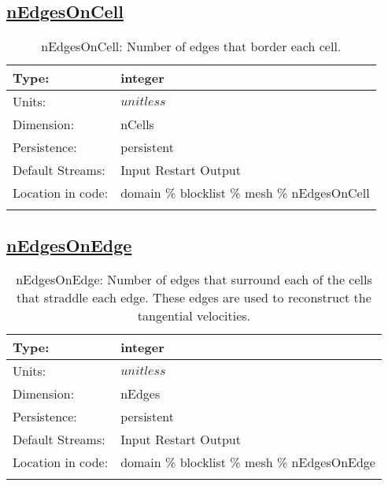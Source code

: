 \subsection[nEdgesOnCell]{\hyperref[sec:var_tab_mesh]{nEdgesOnCell}}
\label{subsec:var_sec_mesh_nEdgesOnCell}
\begin{center}
\begin{longtable}{| p{2.0in} | p{4.0in} |}
        \hline 
        Type: & integer \\
        \hline 
        Units: & $unitless$ \\
        \hline 
        Dimension: & nCells \\
        \hline 
        Persistence: & persistent \\
        \hline 
		 Default Streams: & Input Restart Output  \\
        \hline 
		 Location in code: & domain \% blocklist \% mesh \% nEdgesOnCell \\
		 \hline 
    \caption{nEdgesOnCell: Number of edges that border each cell.}
\end{longtable}
\end{center}
\subsection[nEdgesOnEdge]{\hyperref[sec:var_tab_mesh]{nEdgesOnEdge}}
\label{subsec:var_sec_mesh_nEdgesOnEdge}
\begin{center}
\begin{longtable}{| p{2.0in} | p{4.0in} |}
        \hline 
        Type: & integer \\
        \hline 
        Units: & $unitless$ \\
        \hline 
        Dimension: & nEdges \\
        \hline 
        Persistence: & persistent \\
        \hline 
		 Default Streams: & Input Restart Output  \\
        \hline 
		 Location in code: & domain \% blocklist \% mesh \% nEdgesOnEdge \\
		 \hline 
    \caption{nEdgesOnEdge: Number of edges that surround each of the cells that straddle each edge. These edges are used to reconstruct the tangential velocities.}
\end{longtable}
\end{center}
